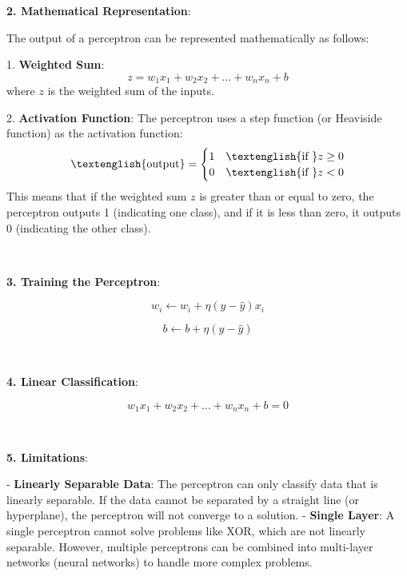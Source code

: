 \documentclass{article}
\renewcommand\text[1]{\textnormal{\textenglish{#1}}}
\newenvironment{cheatformula}[1][כותרת]{
    \begin{minipage}{\linewidth}
    \textbf{#1}:
}{
    \end{minipage}\\[0ex]
}
\begin{document}
\begin{multicols*}{2}
\begin{cheatformula}[2. Mathematical Representation]
The output of a perceptron can be represented mathematically as follows:

1. \textbf{Weighted Sum}:
   \begin{equation}
   z = w_1x_1 + w_2x_2 + \ldots + w_nx_n + b
   \end{equation}
   where $z$ is the weighted sum of the inputs.

2. \textbf{Activation Function}:
   The perceptron uses a step function (or Heaviside function) as the activation function:
   \begin{equation}
   \text{output} = 
   \begin{cases} 
   1 & \text{if } z \geq 0 \\
   0 & \text{if } z < 0 
   \end{cases}
   \end{equation}
   This means that if the weighted sum $z$ is greater than or equal to zero, the perceptron outputs 1 (indicating one class), and if it is less than zero, it outputs 0 (indicating the other class).
\end{cheatformula}

\begin{cheatformula}[3. Training the Perceptron]

\begin{equation}
w_i \leftarrow w_i + \eta (y - \hat{y}) x_i
\end{equation}

\begin{equation}
b \leftarrow b + \eta (y - \hat{y})
\end{equation}

\end{cheatformula}

\begin{cheatformula}[4. Linear Classification]

\begin{equation}
w_1x_1 + w_2x_2 + \ldots + w_nx_n + b = 0
\end{equation}

\end{cheatformula}

\begin{cheatformula}[5. Limitations]

- \textbf{Linearly Separable Data}: The perceptron can only classify data that is linearly separable. If the data cannot be separated by a straight line (or hyperplane), the perceptron will not converge to a solution.
- \textbf{Single Layer}: A single perceptron cannot solve problems like XOR, which are not linearly separable. However, multiple perceptrons can be combined into multi-layer networks (neural networks) to handle more complex problems.
\end{cheatformula}

\end{multicols*}
\newpage
\end{document}
